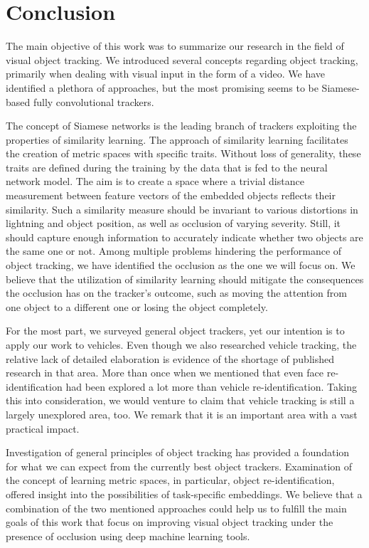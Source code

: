 \chapter{Conclusion}
\label{chap:Conclusion}

The main objective of this work was to summarize our research in the field of visual object tracking. We introduced several concepts regarding object tracking, primarily when dealing with visual input in the form of a video. We have identified a plethora of approaches, but the most promising seems to be Siamese-based fully convolutional trackers.

The concept of Siamese networks is the leading branch of trackers exploiting the properties of similarity learning. The approach of similarity learning facilitates the creation of metric spaces with specific traits. Without loss of generality, these traits are defined during the training by the data that is fed to the neural network model. The aim is to create a space where a trivial distance measurement between feature vectors of the embedded objects reflects their similarity. Such a similarity measure should be invariant to various distortions in lightning and object position, as well as occlusion of varying severity. Still, it should capture enough information to accurately indicate whether two objects are the same one or not. Among multiple problems hindering the performance of object tracking, we have identified the occlusion as the one we will focus on. We believe that the utilization of similarity learning should mitigate the consequences the occlusion has on the tracker's outcome, such as moving the attention from one object to a different one or losing the object completely.

For the most part, we surveyed general object trackers, yet our intention is to apply our work to vehicles. Even though we also researched vehicle tracking, the relative lack of detailed elaboration is evidence of the shortage of published research in that area. More than once when we mentioned that even face re-identification had been explored a lot more than vehicle re-identification. Taking this into consideration, we would venture to claim that vehicle tracking is still a largely unexplored area, too. We remark that it is an important area with a vast practical impact.

Investigation of general principles of object tracking has provided a foundation for what we can expect from the currently best object trackers. Examination of the concept of learning metric spaces, in particular, object re-identification, offered insight into the possibilities of task-specific embeddings. We believe that a combination of the two mentioned approaches could help us to fulfill the main goals of this work that focus on improving visual object tracking under the presence of occlusion using deep machine learning tools.